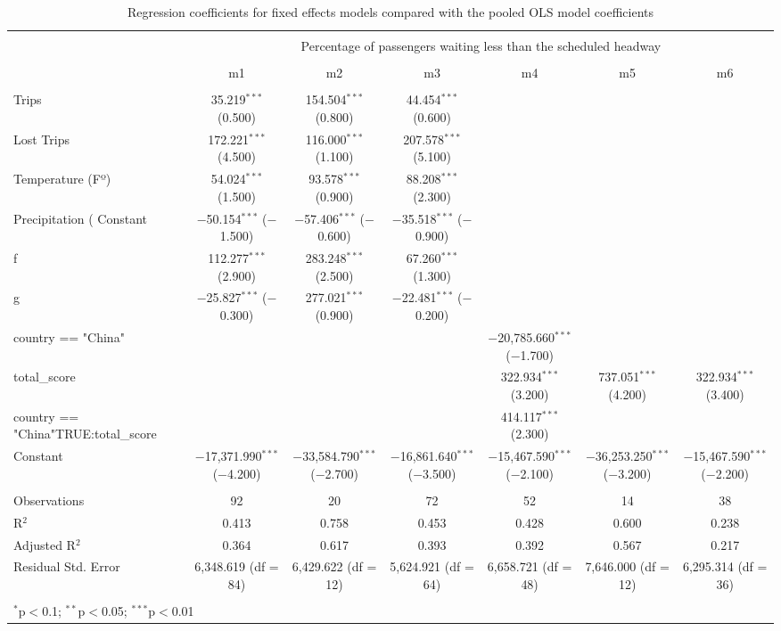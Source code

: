 
\begin{table}[!htbp] \centering 
  \caption{Regression coefficients for fixed effects models compared with the pooled OLS model coefficients} 
  \label{} 
\begin{tabular}{@{\extracolsep{0pt}}lcccccc} 
\\[-1.8ex]\hline 
\hline \\[-1.8ex] 
 & \multicolumn{6}{c}{Percentage of passengers waiting less than the scheduled headway} \\ 
\cline{2-7} 
\\[-1.8ex] & m1 & m2 & m3 & m4 & m5 & m6\\ 
\hline \\[-1.8ex] 
 Trips & 35.219$^{***}$ (0.500) & 154.504$^{***}$ (0.800) & 44.454$^{***}$ (0.600) &  &  &  \\ 
  Lost Trips & 172.221$^{***}$ (4.500) & 116.000$^{***}$ (1.100) & 207.578$^{***}$ (5.100) &  &  &  \\ 
  Temperature (Fº) & 54.024$^{***}$ (1.500) & 93.578$^{***}$ (0.900) & 88.208$^{***}$ (2.300) &  &  &  \\ 
  Precipitation (%
  Constant & $-$50.154$^{***}$ ($-$1.500) & $-$57.406$^{***}$ ($-$0.600) & $-$35.518$^{***}$ ($-$0.900) &  &  &  \\ 
  f & 112.277$^{***}$ (2.900) & 283.248$^{***}$ (2.500) & 67.260$^{***}$ (1.300) &  &  &  \\ 
  g & $-$25.827$^{***}$ ($-$0.300) & 277.021$^{***}$ (0.900) & $-$22.481$^{***}$ ($-$0.200) &  &  &  \\ 
  country == "China" &  &  &  & $-$20,785.660$^{***}$ ($-$1.700) &  &  \\ 
  total\_score &  &  &  & 322.934$^{***}$ (3.200) & 737.051$^{***}$ (4.200) & 322.934$^{***}$ (3.400) \\ 
  country == "China"TRUE:total\_score &  &  &  & 414.117$^{***}$ (2.300) &  &  \\ 
  Constant & $-$17,371.990$^{***}$ ($-$4.200) & $-$33,584.790$^{***}$ ($-$2.700) & $-$16,861.640$^{***}$ ($-$3.500) & $-$15,467.590$^{***}$ ($-$2.100) & $-$36,253.250$^{***}$ ($-$3.200) & $-$15,467.590$^{***}$ ($-$2.200) \\ 
 \hline \\[-1.8ex] 
Observations & 92 & 20 & 72 & 52 & 14 & 38 \\ 
R$^{2}$ & 0.413 & 0.758 & 0.453 & 0.428 & 0.600 & 0.238 \\ 
Adjusted R$^{2}$ & 0.364 & 0.617 & 0.393 & 0.392 & 0.567 & 0.217 \\ 
Residual Std. Error & 6,348.619 (df = 84) & 6,429.622 (df = 12) & 5,624.921 (df = 64) & 6,658.721 (df = 48) & 7,646.000 (df = 12) & 6,295.314 (df = 36) \\ 
\hline 
\hline \\[-1.8ex] 
\multicolumn{7}{l}{$^{*}$p$<$0.1; $^{**}$p$<$0.05; $^{***}$p$<$0.01} \\ 
\end{tabular} 
\end{table} 
